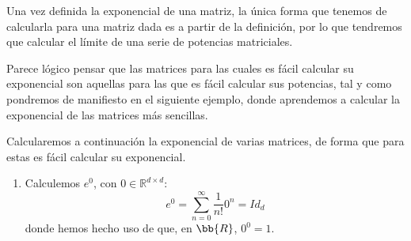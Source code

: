\noindent
Una vez definida la exponencial de una matriz, la única forma que tenemos de calcularla para una matriz dada es a partir de la definición, por lo que tendremos que calcular el límite de una serie de potencias matriciales.

Parece lógico pensar que las matrices para las cuales es fácil calcular su exponencial son aquellas para las que es fácil calcular sus potencias, tal y como pondremos de manifiesto en el siguiente ejemplo, donde aprendemos a calcular la exponencial de las matrices más sencillas.
\begin{ejemplo}
    Calcularemos a continuación la exponencial de varias matrices, de forma que para estas es fácil calcular su exponencial.
    
    \begin{enumerate}
        \item Calculemos $e^0$, con $0\in \mathbb{R}^{d\times d}$:
            \begin{equation*}
                e^0 = \sum_{n=0}^{\infty} \dfrac{1}{n!}0^n = Id_d
            \end{equation*}
        donde hemos hecho uso de que, en $\bb{R}$, $0^0=1$.


\end{enumerate}
\end{ejemplo}
